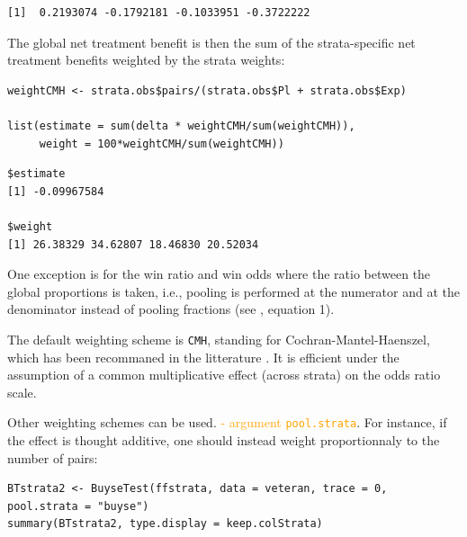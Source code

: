 \documentclass[12pt]{article}
\newcommand\Warning[1][3ex]{%
\renewcommand\stacktype{L}%
\scaleto{\stackon[1.3pt]{\color{red}$\triangle$}{\tiny\bfseries !}}{#1}%
\xspace
}
\begin{document}
\begin{verbatim}
[1]  0.2193074 -0.1792181 -0.1033951 -0.3722222
\end{verbatim}


The global net treatment benefit is then the sum of the strata-specific net
treatment benefits weighted by the strata weights:
\lstset{language=r,label= ,caption= ,captionpos=b,numbers=none}
\begin{lstlisting}
weightCMH <- strata.obs$pairs/(strata.obs$Pl + strata.obs$Exp)

list(estimate = sum(delta * weightCMH/sum(weightCMH)),
     weight = 100*weightCMH/sum(weightCMH))
\end{lstlisting}

\begin{verbatim}
$estimate
[1] -0.09967584

$weight
[1] 26.38329 34.62807 18.46830 20.52034
\end{verbatim}


\Warning One exception is for the win ratio and win odds where the
ratio between the global proportions is taken, i.e., pooling is
performed at the numerator and at the denominator instead of pooling
fractions (see \citep{dong2018stratified}, equation 1).


\clearpage

The default weighting scheme is \texttt{CMH}, standing for
Cochran-Mantel-Haenszel, which has been recommaned in the litterature
\citep{dong2018stratified}. It is efficient under the assumption of a
common multiplicative effect (across strata) on the odds ratio
scale. 

\bigskip 

Other weighting schemes can be used. \hfill \textcolor{orange}{-
argument \texttt{pool.strata}}. \newline For instance, if the effect is
thought additive, one should instead weight proportionnaly to the
number of pairs:
\lstset{language=r,label= ,caption= ,captionpos=b,numbers=none}
\begin{lstlisting}
BTstrata2 <- BuyseTest(ffstrata, data = veteran, trace = 0, pool.strata = "buyse")
summary(BTstrata2, type.display = keep.colStrata)
\end{lstlisting}
\end{document}
